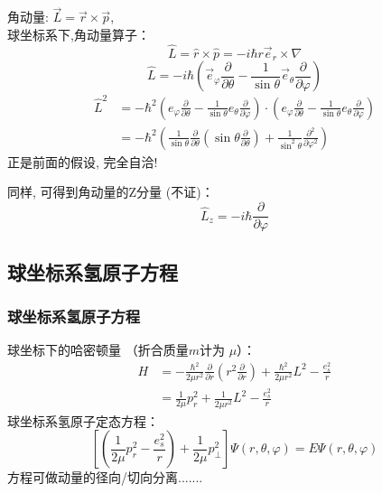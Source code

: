 \begin{frame}
	角动量: $ \vec{L}= \vec{r}\times \vec{p} $, \\
	球坐标系下,角动量算子：
	\begin{equation*}
		\hat{L}= \hat{r}\times \hat{p} = -i \hbar r \vec{e}_r \times \nabla  
	\end{equation*}
	\begin{equation*}
		\hat{L}=   -i \hbar   ( \vec{e}_{\varphi} \frac{\partial}{\partial \theta} - \frac{1}{\sin \theta}  \vec{e}_{\theta} \frac{\partial}{\partial \varphi} )
	\end{equation*}
	\begin{equation*}
		\begin{split}
		\hat{L}	^2 &=   - \hbar ^2  ( e_{\varphi} \frac{\partial}{\partial \theta} - \frac{1}{\sin \theta}  e_{\theta} \frac{\partial}{\partial \varphi} )  \cdot   ( e_{\varphi} \frac{\partial}{\partial \theta} - \frac{1}{\sin \theta}  e_{\theta} \frac{\partial}{\partial \varphi} ) \\
		&= - \hbar ^2 (\frac{1}{\sin \theta  } \frac{\partial }{\partial \theta } (\sin \theta \frac{\partial }{\partial \theta } )
		+\frac{1}{\sin^2 \theta  } \frac{\partial^2}{\partial\varphi ^2} ) 	
		\end{split}
	\end{equation*}
	正是前面的假设, 完全自洽!\\ \vspace{1em}

	同样, 可得到角动量的Z分量 (不证)：
	\begin{equation*}
		\hat{L}_z= -i \hbar \frac{\partial }{\partial\varphi }
	\end{equation*}	
\end{frame}	

\subsection{球坐标系氢原子方程 }	

\begin{frame}
	\frametitle{ 球坐标系氢原子方程 }	
	球坐标下的哈密顿量 （折合质量$m$计为 $\mu$）：
	\begin{equation*}
		\begin{split}
		H&=-\frac{\hbar^2}{2 \mu r^2}  \frac{\partial }{\partial r} (r^2\frac{\partial }{\partial r} ) +  \frac{\hbar^2}{2 \mu r^2} L^2  -\frac{e_s ^2}{r} \\
		&= \frac{1}{2 \mu } p_r ^2 +  \frac{1}{2 \mu r^2} L^2  -\frac{e_s ^2}{r} 	
		\end{split}	
	\end{equation*}	
	球坐标系氢原子定态方程：	
	\begin{equation*}
		\left[ (\frac{1}{2 \mu } p_r ^2  -\frac{e_s ^2}{r})  +\frac{1}{2 \mu }	p_ \perp  ^2   \right] \Psi (r,\theta,\varphi) =E \Psi (r,\theta,\varphi)  
	\end{equation*}	
	方程可做动量的径向/切向分离.......\\
\end{frame}		


